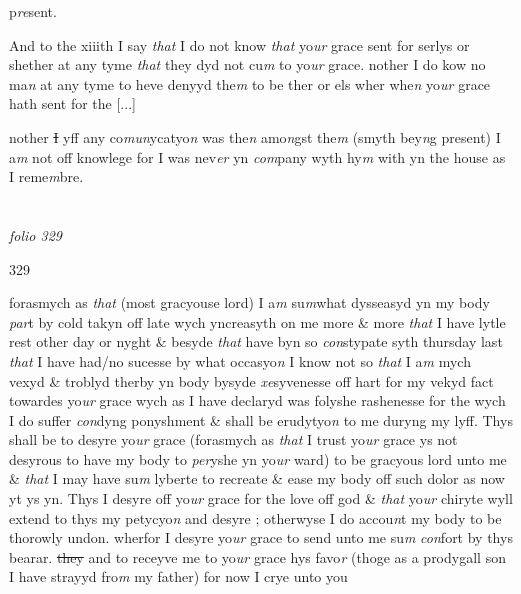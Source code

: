 \documentclass[12pt, a4paper]{book}
\begin{document}
p\textit{re}sent.

				\marginpar[\vspace{0.5cm}{\textcolor{Gray}{13}}]{}
			
		\ifthenelse{\isodd{\thepage}}
		{\reversemarginpar}
		{\normalmarginpar}
		And to the xiiith I say \textit{that} I do not know \textit{that} yo\textit{ur} grace sent for serlys or shether
at any tyme \textit{that} they dyd not cu\textit{m} to yo\textit{ur} grace. nother I do kow no ma\textit{n }at any
tyme to heve denyyd the\textit{m} to be ther or els wher whe\textit{n} yo\textit{ur} grace hath sent for the
				[...]
			
nother \sout{I} yff any co\textit{mun}ycatyo\textit{n} was the\textit{n} amo\textit{n}gst the\textit{m} (smyth bey\textit{n}g present) I a\textit{m}
not off knowlege for I was nev\textit{er} yn \textit{com}pany wyth hy\textit{m} with yn the house as I 
reme\textit{m}bre.
               
\dotfill
						\newpage {} \section*{}

\textit{folio 329}



\begin{flushright}{\color{Mahogany}329}\end{flushright}

		\ifthenelse{\isodd{\thepage}}
		{\reversemarginpar}
		{\normalmarginpar}
		forasmych as \textit{that} (most gracyouse lord) I a\textit{m} su\textit{m}what dysseasyd yn my body
\textit{par}t by cold takyn off late wych yncreasyth on me more \& more \textit{that} I have
lytle rest other day or nyght \& besyde \textit{that} have byn so \textit{con}stypate syth thursday
last \textit{that} I have had/no sucesse by what occasyo\textit{n} I know not so \textit{that} I a\textit{m} mych 
vexyd \& troblyd therby yn body bysyde \textit{xe}syvenesse off hart for my vekyd
fact towardes yo\textit{ur}
			grace wych as I have declaryd was folyshe rashenesse for the
wych I do suffer \textit{con}dyng ponyshment \& shall be erudytyo\textit{n} to me duryng my
lyff. Thys shall be to desyre yo\textit{ur} grace (forasmych as \textit{that} I trust yo\textit{ur} grace
ys not desyrous to have my body to \textit{per}yshe yn yo\textit{ur} ward) to be gracyous lord
unto me \& \textit{that} I may have su\textit{m} lyberte to recreate \& ease my body off such dolor
as now yt ys yn. Thys I desyre off yo\textit{ur} grace for the love off god \& \textit{that} yo\textit{ur }chiryte 
wyll extend to thys my petycyo\textit{n} and desyre ; otherwyse I do accou\textit{n}t my body
to be thorowly undon. wherfor I desyre yo\textit{ur} grace to send unto me su\textit{m}
               \textit{con}fort
by thys bearar. \sout{they }and to receyve me to yo\textit{ur} grace hys favo\textit{r}
(thoge as a prodygall son I have strayyd fro\textit{m} my father) for now I crye unto you
\end{document}
